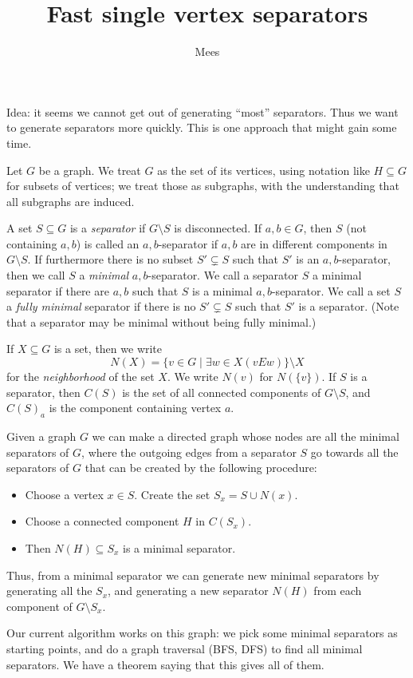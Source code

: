 \documentclass{article}
\title{Fast single vertex separators}
\author{Mees}
\begin{document}
\maketitle
Idea: it seems we cannot get out of generating ``most'' separators. Thus we want to generate
separators more quickly. This is one approach that might gain some time.

Let $G$ be a graph. We treat $G$ as the set of its vertices, using notation like $H \subseteq
G$ for subsets of vertices; we treat those as subgraphs, with the understanding that all
subgraphs are induced.

A set $S \subseteq G$ is a \emph{separator} if $G \setminus S$ is disconnected. If $a, b \in
G$, then $S$ (not containing $a, b$) is called an $a, b$-separator if $a, b$ are in different
components in $G \setminus S$. If furthermore there is no subset $S' \subsetneq S$ such that
$S'$ is an $a, b$-separator, then we call $S$ a \emph{minimal} $a, b$-separator. We call a
separator $S$ a minimal separator if there are $a, b$ such that $S$ is a minimal $a,
b$-separator. We call a set $S$ a \emph{fully minimal} separator if there is no $S' \subsetneq
S$ such that $S'$ is a separator. (Note that a separator may be minimal without being fully
minimal.)

If $X \subseteq G$ is a set, then we write
\[
    N(X) = \{v \in G \mid \exists w \in X(vEw)\} \setminus X
\]
for the \emph{neighborhood} of the set $X$. We write $N(v)$ for $N(\{v\})$. If $S$ is a
separator, then $C(S)$ is the set of all connected components of $G \setminus S$, and $C(S)_a$
is the component containing vertex $a$.

Given a graph $G$ we can make a directed graph whose nodes are all the minimal separators of
$G$, where the outgoing edges from a separator $S$ go towards all the separators of $G$ that
can be created by the following procedure:
\begin{itemize}
    \item Choose a vertex $x \in S$. Create the set $S_x = S \cup N(x)$.
    \item Choose a connected component $H$ in $C(S_x)$.
    \item Then $N(H) \subseteq S_x$ is a minimal separator.
\end{itemize}
Thus, from a minimal separator we can generate new minimal separators by generating all the
$S_x$, and generating a new separator $N(H)$ from each component of $G \setminus S_x$.

Our current algorithm works on this graph: we pick some minimal separators as starting points,
and do a graph traversal (BFS, DFS) to find all minimal separators. We have a theorem saying
that this gives all of them.
\end{document}

